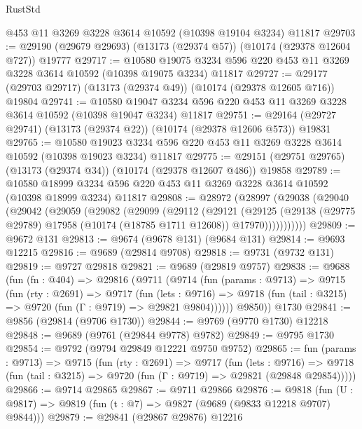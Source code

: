 \begin{lexlean}{RustStd}
\begin{coremodule}
    @453
    @11
    @3269
    @3228
    @3614
    @10592
    (@10398 @19104 @3234)
    @11817
@29703 := @29190 (@29679 @29693) (@13173 (@29374 @57)) (@10174 (@29378 @12604 @727)) @19777
@29717 := @10580
    @19075
    @3234
    @596
    @220
    @453
    @11
    @3269
    @3228
    @3614
    @10592
    (@10398 @19075 @3234)
    @11817
@29727 := @29177 (@29703 @29717) (@13173 (@29374 @49)) (@10174 (@29378 @12605 @716)) @19804
@29741 := @10580
    @19047
    @3234
    @596
    @220
    @453
    @11
    @3269
    @3228
    @3614
    @10592
    (@10398 @19047 @3234)
    @11817
@29751 := @29164 (@29727 @29741) (@13173 (@29374 @22)) (@10174 (@29378 @12606 @573)) @19831
@29765 := @10580
    @19023
    @3234
    @596
    @220
    @453
    @11
    @3269
    @3228
    @3614
    @10592
    (@10398 @19023 @3234)
    @11817
@29775 := @29151 (@29751 @29765) (@13173 (@29374 @34)) (@10174 (@29378 @12607 @486)) @19858
@29789 := @10580
    @18999
    @3234
    @596
    @220
    @453
    @11
    @3269
    @3228
    @3614
    @10592
    (@10398 @18999 @3234)
    @11817
@29808 := @28972
    (@28997
      (@29038
        (@29040
          (@29042
            (@29059
              (@29082
                (@29099
                  (@29112
                    (@29121
                      (@29125
                        (@29138
                          (@29775 @29789)
                          @17958
                          (@10174 (@18785 @1711 @12608))
                          @17970)))))))))))
@29809 := @9672 @131
@29813 := @9674 (@9678 @131) (@9684 @131)
@29814 := @9693 @12215
@29816 := @9689 (@29814 @9708)
@29818 := @9731 (@9732 @131)
@29819 := @9727 @29818
@29821 := @9689 (@29819 @9757)
@29838 := @9688
    (fun (fn : @404) =>
    @29816
      (@9711
        (@9714
          (fun (params : @9713) =>
          @9715
            (fun (rty : @2691) =>
            @9717
              (fun (lets : @9716) =>
              @9718 (fun (tail : @3215) => @9720 (fun (Γ : @9719) => @29821 @9804))))))
        @9850))
    @1730
@29841 := @9856 (@29814 (@9706 @1730))
@29844 := @9769 (@9770 @1730) @12218
@29848 := @9689 (@9761 (@29844 @9778) @9782)
@29849 := @9795 @1730
@29854 := @9792 (@9794 @29849 @12221 @9750 @9752)
@29865 := fun (params : @9713) =>
  @9715
    (fun (rty : @2691) =>
    @9717
      (fun (lets : @9716) =>
      @9718 (fun (tail : @3215) => @9720 (fun (Γ : @9719) => @29821 (@29848 @29854)))))
@29866 := @9714 @29865
@29867 := @9711 @29866
@29876 := @9818
    (fun (U : @9817) => @9819 (fun (t : @7) => @9827 (@9689 (@9833 @12218 @9707) @9844)))
@29879 := @29841 (@29867 @29876) @12216

\end{coremodule}
\end{lexlean}
